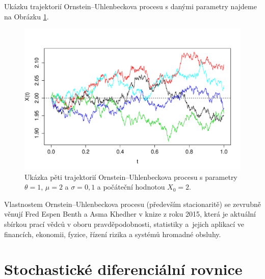 \documentclass[a4paper,12pt]{report}
\theoremstyle{definition} \newtheorem{definice}[veta]{Definice}
\theoremstyle{remark}
\begin{document}
Ukázku trajektorií Ornstein–Uhlenbeckova procesu s danými parametry najdeme na Obrázku \ref{OU_graf}.

\begin{figure}[!htbp]
  \centering 
	\includegraphics[width=13.5cm, clip, trim= 0 15 25 50]{IMG/OU_v4.pdf}
  \caption{Ukázka pěti trajektorií Ornstein–Uhlenbeckova procesu s parametry $\theta=1$, $\mu=2$ a  $\sigma=0,1$ a počáteční hodnotou $X_0=2$.}  \label{OU_graf}
\end{figure}

Vlastnostem Ornstein–Uhlenbeckova procesu (především stacionaritě) se zevrubně věnují Fred Espen Benth a Asma Khedher v knize \cite{podolskij2015fascination} z roku 2015, která je aktuální sbírkou prací vědců v oboru pravděpodobnosti, statistiky a~jejich aplikací ve financích, ekonomii, fyzice, řízení rizika a systémů hromadné obsluhy.




\section{Stochastické diferenciální rovnice}
\end{document}
